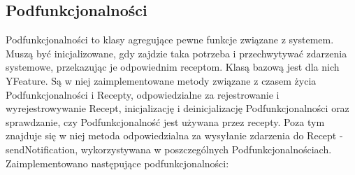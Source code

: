 \documentclass[11pt,a4paper,polish,thesis]{dcsbook}
\begin{document}
\subsection{Podfunkcjonalności}
Podfunkcjonalności to klasy agregujące pewne funkcje związane z systemem. Muszą być inicjalizowane, gdy zajdzie taka potrzeba i przechwytywać zdarzenia systemowe, przekazując je odpowiednim receptom. Klasą bazową jest dla nich YFeature. Są w niej zaimplementowane metody związane z czasem życia Podfunkcjonalności i Recepty, odpowiedzialne za rejestrowanie i wyrejestrowywanie Recept, inicjalizację i deinicjalizację Podfunkcjonalności oraz sprawdzanie, czy Podfunkcjonalność jest używana przez recepty. Poza tym znajduje się w niej metoda odpowiedzialna za wysyłanie zdarzenia do Recept - sendNotification, wykorzystywana w poszczególnych Podfunkcjonalnościach. Zaimplementowano następujące podfunkcjonalności:
\end{document}
